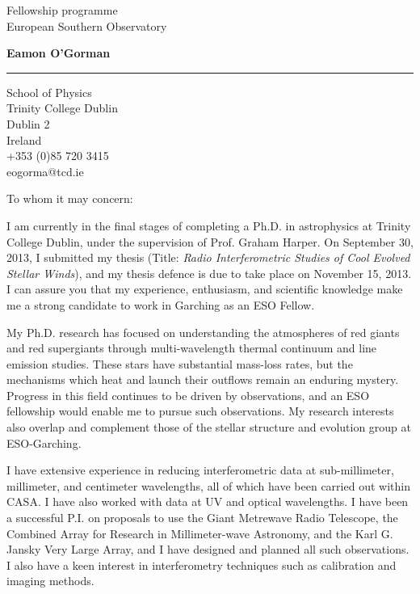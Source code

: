 \documentclass[10pt]{letter} %
\begin{document}
\longindentation=0pt                       %
\let\raggedleft\raggedright                %
 
\begin{letter}{Fellowship programme \\
European Southern Observatory \\
}

\begin{flushleft}
{\large\bf Eamon O'Gorman}
\end{flushleft}
\medskip\hrule height 1pt
\begin{flushright}
\hfill School of Physics \\
\hfill Trinity College Dublin \\
\hfill Dublin 2 \\
\hfill Ireland \\
\hfill +353 (0)85 720 3415 \\
\hfill eogorma@tcd.ie \\

\end{flushright} 
\vfill %

\opening{To whom it may concern:} 

 
\noindent I am currently in the final stages of completing a Ph.D. in astrophysics at Trinity College Dublin, under the supervision of Prof. Graham Harper. On September 30, 2013, I submitted my thesis (Title: \textit{Radio Interferometric Studies of Cool Evolved Stellar Winds}), and my thesis defence is due to take place on November 15, 2013. I can assure you that my experience, enthusiasm, and scientific knowledge make me a strong candidate to work in Garching as an ESO Fellow. 

\noindent My Ph.D. research has focused on understanding the atmospheres of red giants and red supergiants through multi-wavelength thermal continuum and line emission studies. These stars have substantial mass-loss rates, but the mechanisms which heat and launch their outflows remain an enduring mystery. Progress in this field continues to be driven by observations, and an ESO fellowship would enable me to pursue such observations. My research interests also overlap and complement those of the stellar structure and evolution group at ESO-Garching.

\noindent I have extensive experience in reducing interferometric data at sub-millimeter, millimeter, and centimeter wavelengths, all of which have been carried out within CASA. I have also worked with data at UV and optical wavelengths. I have been a successful P.I. on proposals to use the Giant Metrewave Radio Telescope, the Combined Array for Research in Millimeter-wave Astronomy, and the Karl G. Jansky Very Large Array, and I have designed and planned all such observations. I also have a keen interest in interferometry techniques such as calibration and imaging methods.


\end{letter}
\end{document}
